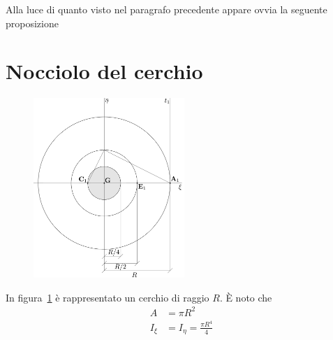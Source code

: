 \noindent Alla luce di quanto visto nel paragrafo precedente appare ovvia la seguente proposizione 
\\

\section{Nocciolo del cerchio}
\renewcommand{\thefigure}{6~-~6}
\begin{figure}[ht]
\centering
\includegraphics[width=0.51\textwidth]{Immagini/Parte_6/Figura6_6/Figura6_6.pdf}
\caption{}
\label{figura6-6}
\end{figure}
\noindent In figura~\ref{figura6-6} è rappresentato un cerchio di raggio $R$. È noto che 
\begin{align*}
A &= \pi R^2 \\ 
I_{\xi} &= I_{\eta} = \frac{\pi R^4}{4}
\end{align*}
